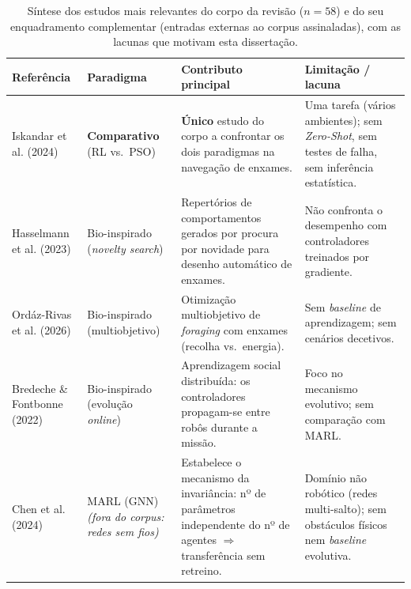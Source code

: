 \documentclass[12pt,reqno, twoside]{amsbook}
\theoremstyle{plain}
\numberwithin{equation}{chapter}
\numberwithin{section}{chapter}
\numberwithin{table}{chapter}
\numberwithin{figure}{chapter}
\begin{document}
\begin{table}[!htbp]
    \centering
    \footnotesize
    \caption[Síntese dos estudos mais relevantes do corpo da revisão]{Síntese dos estudos mais relevantes do corpo da revisão ($n=58$) e do seu enquadramento complementar (entradas externas ao corpus assinaladas), com as lacunas que motivam esta dissertação.}
    \label{tab:sota_summary}
    \renewcommand{\arraystretch}{1.1}
    \begin{tabular}{|p{2.6cm}|p{2.3cm}|p{4.2cm}|p{4.2cm}|}
        \hline
        \textbf{Referência} & \textbf{Paradigma} & \textbf{Contributo principal} & \textbf{Limitação / lacuna} \\ \hline

        Iskandar et al. (2024) \cite{iskandar2024comparative} & \textbf{Comparativo} (RL vs.\ PSO) & \textbf{Único} estudo do corpo a confrontar os dois paradigmas na navegação de enxames. & Uma tarefa (vários ambientes); sem \textit{Zero-Shot}, sem testes de falha, sem inferência estatística. \\ \hline

        Hasselmann et al. (2023) \cite{hasselmann2023novelty} & Bio-inspirado (\textit{novelty search}) & Repertórios de comportamentos gerados por procura por novidade para desenho automático de enxames. & Não confronta o desempenho com controladores treinados por gradiente. \\ \hline

        Ordáz-Rivas et al. (2026) \cite{ordaz2026foraging} & Bio-inspirado (multiobjetivo) & Otimização multiobjetivo de \textit{foraging} com enxames (recolha vs.\ energia). & Sem \textit{baseline} de aprendizagem; sem cenários decetivos. \\ \hline

        Bredeche \& Fontbonne (2022) \cite{bredeche2022social} & Bio-inspirado (evolução \textit{online}) & Aprendizagem social distribuída: os controladores propagam-se entre robôs durante a missão. & Foco no mecanismo evolutivo; sem comparação com MARL. \\ \hline

        Chen et al. (2024) \cite{chen2024graph} & MARL (GNN) \newline \textit{(fora do corpus: redes sem fios)} & Estabelece o mecanismo da invariância: nº de parâmetros independente do nº de agentes $\Rightarrow$ transferência sem retreino. & Domínio não robótico (redes multi-salto); sem obstáculos físicos nem \textit{baseline} evolutiva. \\ \hline


\end{tabular}
\end{table}
\end{document}
